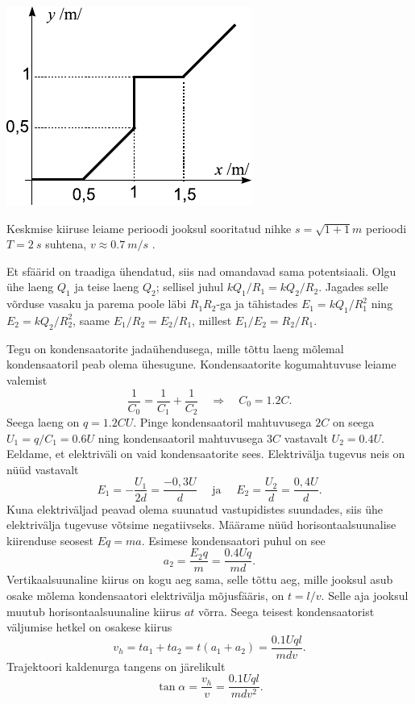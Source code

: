 \documentclass[10pt]{article}
\begin{document}
{\begin{center}
	\includegraphics[width=0.6\linewidth]{2009-v2g-06-lah}
\end{center}

Keskmise kiiruse leiame perioodi jooksul sooritatud nihke $s = \sqrt{1+1}\si{m}$ perioodi $T = \SI{2}{s}$ suhtena, $v \approx \SI{0,7}{m/s}$ .
\probend
\bigskip


\solu
Et sfäärid on traadiga ühendatud, siis nad omandavad sama potentsiaali. Olgu ühe laeng $Q_1$ ja teise laeng $Q_2$;
sellisel juhul $kQ_1/R_1=kQ_2/R_2$. Jagades selle võrduse vasaku ja parema poole läbi $R_1R_2$-ga ja tähistades $E_1=kQ_1/R_1^2$ ning
$E_2=kQ_2/R_2^2$, saame $E_1/R_2 = E_2/R_1$, millest $E_1/E_2=R_2/R_1$.
\probend
\bigskip


\solu
Tegu on kondensaatorite jadaühendusega, mille tõttu laeng mõlemal kondensaatoril peab olema ühesugune. Kondensaatorite kogumahtuvuse leiame valemist 
\[
\frac{1}{C_{0}}=\frac{1}{C_{1}}+\frac{1}{C_{2}} \quad \Rightarrow \quad C_{0}=\num{1,2} C.
\]
Seega laeng on $q = \num{1,2}CU$. Pinge kondensaatoril mahtuvusega $2C$ on seega $U_1 = q/C_1 = \num{0,6}U$ ning kondensaatoril mahtuvusega $3C$ vastavalt $U_2 = \num{0,4}U$. Eeldame, et elektriväli on vaid kondensaatorite sees. Elektrivälja tugevus neis on nüüd vastavalt
\[
E_{1}=-\frac{U_{1}}{2 d}=\frac{-0,3 U}{d} \quad \text { ja } \quad E_{2}=\frac{U_{2}}{d}=\frac{0,4 U}{d}.
\]
Kuna elektriväljad peavad olema suunatud vastupidistes suundades, siis ühe elektrivälja tugevuse võtsime negatiivseks. Määrame nüüd horisontaalsuunalise kiirenduse seosest $Eq = ma$. Esimese kondensaatori puhul on see
\[
a_{2}=\frac{E_{2} q}{m}=\frac{\num{0,4} U q}{m d}.
\]
Vertikaalsuunaline kiirus on kogu aeg sama, selle tõttu aeg, mille jooksul asub osake mõlema kondensaatori elektrivälja mõjusfääris, on $t = l/v$. Selle aja jooksul muutub horisontaalsuunaline kiirus $at$ võrra. Seega teisest kondensaatorist väljumise hetkel on osakese kiirus
\[
v_{h}=t a_{1}+t a_{2}=t\left(a_{1}+a_{2}\right)=\frac{\num{0,1} U q l}{m d v}.
\]
Trajektoori kaldenurga tangens on järelikult
\[
\tan \alpha = \frac{v_h}{v} = \frac{\num{0,1}Uql}{mdv^2}.
\]
\probend
\bigskip

}
\end{document}
